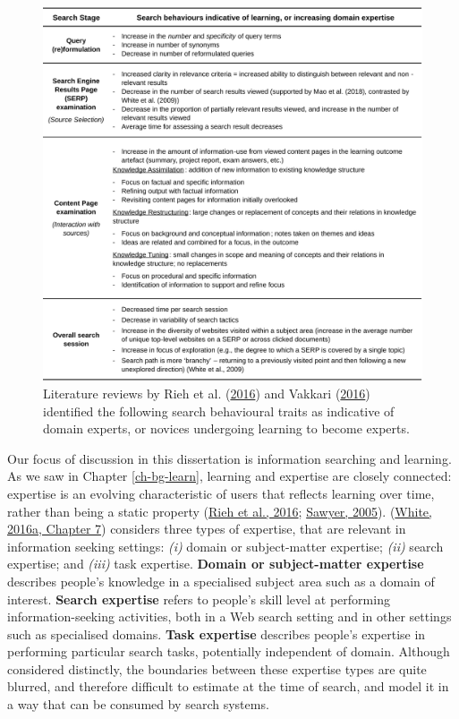 \documentclass[letterpaper, nobind]{templates/ociamthesis}
\begin{document}
\begin{figure}

{\centering \includegraphics[width=1\linewidth]{figs/search-behaviours} 

}

\caption[Components of metacognition.]{Literature reviews by Rieh et al. (\protect\hyperlink{ref-rieh2016searching}{2016}) and Vakkari (\protect\hyperlink{ref-vakkari2016searching}{2016}) identified the following search behavioural traits as indicative of domain experts, or novices undergoing learning to become experts.}\label{fig:search-behaviours}
\end{figure}





Our focus of discussion in this dissertation is information searching and
learning. As we saw in Chapter \ref{ch-bg-learn}, learning and expertise are closely connected:
expertise is an evolving characteristic of users that reflects learning
over time, rather than being a static property
(\protect\hyperlink{ref-rieh2016searching}{Rieh et al., 2016}; \protect\hyperlink{ref-sawyer2005cambridge}{Sawyer, 2005}). (\protect\hyperlink{ref-white2016interactions}{White, 2016a, Chapter 7}) considers three types of expertise, that are relevant in
information seeking settings: \emph{(i)} domain or subject-matter expertise;
\emph{(ii)} search expertise; and \emph{(iii)} task expertise. \textbf{Domain or
subject-matter expertise} describes people's knowledge in a specialised
subject area such as a domain of interest. \textbf{Search expertise} refers
to people's skill level at performing information-seeking activities,
both in a Web search setting and in other settings such as specialised
domains. \textbf{Task expertise} describes people's expertise in performing
particular search tasks, potentially independent of domain. Although
considered distinctly, the boundaries between these expertise types are
quite blurred, and therefore difficult to estimate at the time of
search, and model it in a way that can be consumed by search systems.
\end{document}
